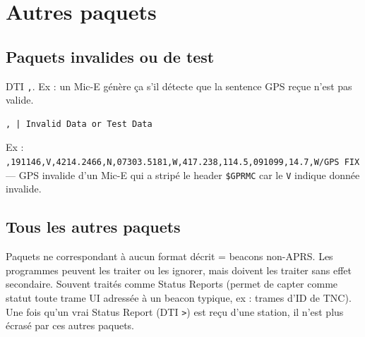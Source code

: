 \chapter[AUTRES PAQUETS]{Autres paquets}\label{autres-paquets}

\section{Paquets invalides ou de
test}\label{paquets-invalides-ou-de-test}

DTI \texttt{,}. Ex : un Mic-E génère ça s'il détecte que la sentence GPS
reçue n'est pas valide.

\begin{verbatim}
, | Invalid Data or Test Data
\end{verbatim}

Ex :
\texttt{,191146,V,4214.2466,N,07303.5181,W,417.238,114.5,091099,14.7,W/GPS\ FIX}
--- GPS invalide d'un Mic-E qui a stripé le header \texttt{\$GPRMC} car
le \texttt{V} indique donnée invalide.

\section{Tous les autres paquets}\label{tous-les-autres-paquets}

Paquets ne correspondant à aucun format décrit = beacons non-APRS. Les
programmes peuvent les traiter ou les ignorer, mais doivent les traiter
sans effet secondaire. Souvent traités comme Status Reports (permet de
capter comme statut toute trame UI adressée à un beacon typique, ex :
trames d'ID de TNC). Une fois qu'un vrai Status Report (DTI
\texttt{\textgreater{}}) est reçu d'une station, il n'est plus écrasé
par ces autres paquets.

